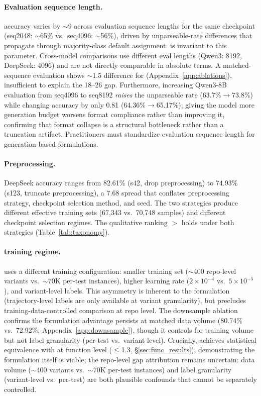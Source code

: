 \paragraph{Evaluation sequence length.} \cwm{} accuracy varies by ${\sim}$9\pp{} across evaluation sequence lengths for the same checkpoint (seq2048: ${\sim}$65\% vs.\ seq4096: ${\sim}$56\%), driven by unparseable-rate differences that propagate through majority-class default assignment. \cls{} is invariant to this parameter. Cross-model \cwm{} comparisons use different eval lengths (Qwen3: 8192, DeepSeek: 4096) and are not directly comparable in absolute terms. A matched-sequence evaluation shows ${\sim}$1.5\pp{} difference for \cls{} (Appendix~\ref{app:ablations}), insufficient to explain the 18--26\pp{} gap. Furthermore, increasing Qwen3-8B \cwm{} evaluation from seq4096 to seq8192 \emph{raises} the unparseable rate (63.7\%$\to$73.8\%) while changing accuracy by only 0.81\pp{} (64.36\%$\to$65.17\%); giving the model more generation budget worsens format compliance rather than improving it, confirming that format collapse is a structural bottleneck rather than a truncation artifact. Practitioners must standardize evaluation sequence length for generation-based formulations.

\paragraph{Preprocessing.} DeepSeek \cls{} accuracy ranges from 82.61\% (s42, drop preprocessing) to 74.93\% (s123, truncate preprocessing), a 7.68\pp{} spread that conflates preprocessing strategy, checkpoint selection method, and seed. The two strategies produce different effective training sets (67,343 vs.\ 70,748 samples) and different checkpoint selection regimes. The qualitative ranking \cls{} $>$ \cwm{} holds under both strategies (Table~\ref{tab:taxonomy}).

\paragraph{\traj{} training regime.} \traj{} uses a different training configuration: smaller training set (${\sim}$400 repo-level variants vs.\ ${\sim}$70K per-test instances), higher learning rate ($2{\times}10^{-4}$ vs.\ $5{\times}10^{-5}$), and variant-level labels. This asymmetry is inherent to the formulation (trajectory-level labels are only available at variant granularity), but precludes training-data-controlled comparison at repo level. The downsample ablation confirms the \cls{} formulation advantage persists at matched data volume (80.74\% vs.\ 72.92\%; Appendix~\ref{app:downsample}), though it controls for training volume but not label granularity (per-test vs.\ variant-level). Crucially, \traj{} achieves statistical equivalence with \cls{} at function level (${\leq}$1.3\pp{}, \S\ref{sec:func_results}), demonstrating the formulation itself is viable; the repo-level gap attribution remains uncertain: data volume (${\sim}$400 variants vs.\ ${\sim}$70K per-test instances) and label granularity (variant-level vs.\ per-test) are both plausible confounds that cannot be separately controlled.

